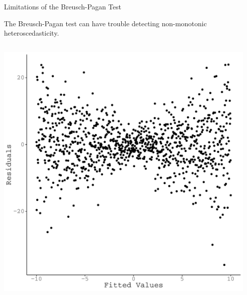 \documentclass{beamer}\usepackage[]{graphicx}\usepackage[]{color}
\makeatletter
\def\maxwidth{ %
  \ifdim\Gin@nat@width>\linewidth
    \linewidth
  \else
    \Gin@nat@width
  \fi
}
\newenvironment{knitrout}{}{} %
\makeatother
\begin{document}
\begin{frame}{Limitations of the Breusch-Pagan Test}
  
  The Breusch-Pagan test can have trouble detecting non-monotonic 
  heteroscedasticity.
  
  \begin{columns}
    \begin{column}{0.5\textwidth}
      
      
\begin{knitrout}\footnotesize
{}\color{fgcolor}

{\centering \includegraphics[width=\maxwidth]{figure/unnamed-chunk-8-1} 

}



\end{knitrout}
      
    \end{column}
    
    \begin{column}{0.5\textwidth}
      
\begin{knitrout}\footnotesize
{}\color{fgcolor}


\end{knitrout}
\end{column}
\end{columns}
\end{frame}
\end{document}
